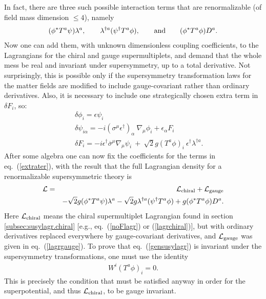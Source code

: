 \documentclass[12pt]{article}
\def\beq{\begin{eqnarray}}
\def\eeq{\end{eqnarray}}
\def\lagr{{\cal L}}
\def\deltaeps{\delta}
\def\sigmabar{\overline\sigma}
\begin{document}
In fact, there are three such possible interaction terms that are
renormalizable (of field mass dimension $\leq 4$), namely
\beq
(\phi^* T^a \psi)\lambda^a,\qquad
\lambda^{\dagger a} (\psi^\dagger T^a
\phi),
\qquad {\rm and} \qquad
(\phi^* T^a \phi) D^a .
\label{extrater}
\eeq
Now one can add them, with unknown dimensionless coupling coefficients, to
the Lagrangians for the chiral and gauge supermultiplets, and demand that
the whole mess be real and invariant under supersymmetry,
up to a total derivative. Not surprisingly, this is possible only if the
supersymmetry transformation laws for the matter fields are modified to
include gauge-covariant rather than ordinary derivatives. Also, it is
necessary to include one strategically chosen extra term in $\delta F_i$,
so: 
\beq
&&
\delta \phi_i = \epsilon\psi_i
\label{gphitran}\\
&&\delta \psi_{i\alpha} =
-i (\sigma^\mu \epsilon^\dagger)_{\alpha}\> \nabla_\mu\phi_i + \epsilon_\alpha F_i
\\
&&\deltaeps F_i = -i \epsilon^\dagger \sigmabar^\mu \nabla_\mu \psi_i
\> + \> \sqrt{2} g (T^a \phi)_i\> \epsilon^\dagger \lambda^{\dagger a} .
\eeq
After some algebra one can now fix the coefficients for the terms in
eq.~(\ref{extrater}), with the result that the full Lagrangian density
for a renormalizable supersymmetric theory is
\beq
\lagr & = & \lagr_{\rm chiral} + \lagr_{\rm gauge} 
\nonumber\\
        && - \sqrt{2} g 
(\phi^* T^a \psi)\lambda^a 
- \sqrt{2} g\lambda^{\dagger a} (\psi^\dagger T^a \phi)
+ g  (\phi^* T^a \phi) D^a .
\label{gensusylagr}
\eeq
Here $\lagr_{\rm chiral }$ means the chiral supermultiplet Lagrangian
found in section \ref{subsec:susylagr.chiral} [e.g., eq.~(\ref{noFlagr})
or (\ref{lagrchiral})], but with ordinary derivatives replaced everywhere
by gauge-covariant derivatives, and $\lagr_{\rm gauge}$ was given in
eq.~(\ref{lagrgauge}). To prove that eq.~(\ref{gensusylagr}) is invariant
under the supersymmetry transformations, one must use the identity
\beq
W^i (T^a \phi)_i = 0.
\label{wgaugeinvar}
\eeq 
This is precisely the condition that must be satisfied anyway in order for
the superpotential, and thus $\lagr_{\rm chiral}$, to be gauge invariant.
\end{document}
